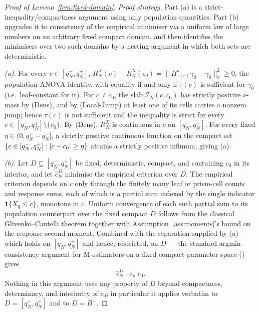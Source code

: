 \documentclass[11pt]{article}
\theoremstyle{plain}
\theoremstyle{definition}
\theoremstyle{remark}
\DeclarePairedDelimiter{\abs}{\lvert}{\rvert}
\begin{document}
\begin{proof}[Proof of Lemma~\ref{lem:fixed-domain}]
\emph{Proof strategy.} Part (a) is a strict-inequality/compactness argument
using only population quantities. Part (b) upgrades it to consistency of
the empirical minimiser via a uniform law of large numbers on an arbitrary
fixed compact domain, and then identifies the minimisers over two such
domains by a nesting argument in which both sets are deterministic.

\emph{(a).} For every $c\in[q_N^-,q_N^+]$,
$R_N^X(c)-R_N^X(c_0)=\|\Pi^\nu_{\tau(c)}\gamma_0-\gamma_0\|_\nu^2\ge0$,
the population ANOVA identity, with equality if and only if $\tau(c)$ is
sufficient for $\gamma_0$ (i.e.\ leaf-constant for it). For $c\ne c_0$, the
slab $\mathcal I_N(c,c_0)$ has strictly positive $\nu$-mass by (Dens), and by
(Local-Jump) at least one of its cells carries a nonzero jump; hence
$\tau(c)$ is not sufficient and the inequality is strict for every
$c\in[q_N^-,q_N^+]\setminus\{c_0\}$. By (Dens), $R_N^X$ is continuous in
$c$ on $[q_N^-,q_N^+]$. For every fixed $\eta\in(0,q_N^+-q_N^-]$, a
strictly positive continuous function on the
compact set $\{c\in[q_N^-,q_N^+]:\abs{c-c_0}\ge\eta\}$ attains a
strictly positive infimum, giving (a).

\emph{(b).} Let $D\subseteq[q_N^-,q_N^+]$ be fixed, deterministic, compact,
and containing $c_0$ in its interior, and let $\widehat c_N^D$ minimise the
empirical criterion over $D$. The empirical criterion depends on $c$ only
through the
finitely many leaf or prism-cell counts and response sums, each of which
is a partial sum indexed by the single indicator $\mathbf 1\{X_q\le c\}$,
monotone in $c$. Uniform convergence of each such partial sum to its
population counterpart over the fixed compact $D$ follows from
the classical Glivenko--Cantelli theorem together with
Assumption~\ref{ass:moments}'s bound on the response second moment.
Combined with the separation supplied by (a) --- which holds on
$[q_N^-,q_N^+]$ and hence, restricted, on $D$ --- the standard
argmin-consistency argument for
M-estimators on a fixed compact parameter space
(\citealt{vandervaart1998}) gives
\[
  \widehat c_N^D\to_pc_0 .
\]
Nothing in this argument uses any property of $D$ beyond compactness,
determinacy, and interiority of $c_0$; in particular it applies verbatim to
$D=[q_N^-,q_N^+]$ and to $D=\overline{B^-}$.


\end{proof}
\end{document}
